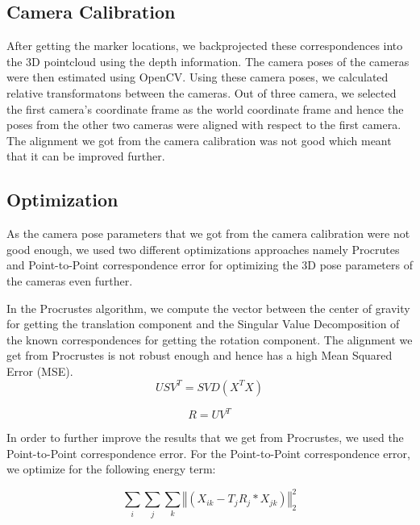 \documentclass[10pt,twocolumn,letterpaper]{article}
\begin{document}
\subsection{Camera Calibration}
After getting the marker locations, we backprojected these correspondences into the 3D pointcloud using the depth information. The camera poses of the cameras were then estimated using OpenCV. Using these camera poses, we calculated relative transformatons between the cameras. Out of three camera, we selected the first camera's coordinate frame as the world coordinate frame and hence the poses from the other two cameras were aligned with respect to the first camera. The alignment we got from the camera calibration was not good which meant that it can be improved further.

\subsection{Optimization}
As the camera pose parameters that we got from the camera calibration were not good enough, we used two different optimizations approaches namely Procrutes and Point-to-Point correspondence error for optimizing the 3D pose parameters of the cameras even further.
 
In the Procrustes algorithm, we compute the vector between the center of gravity for getting the translation component and the Singular Value Decomposition of the known correspondences for getting the rotation component. The alignment we get from Procrustes is not robust enough and hence has a high Mean Squared Error (MSE).\\

\begin{equation}\label{eq3}
USV^T=SVD(X^TX)
\end{equation}

\begin{equation}\label{eq4}
R=UV^T
\end{equation}

In order to further improve the results that we get from Procrustes, we used the Point-to-Point correspondence error. For the Point-to-Point correspondence error, we optimize for the following energy term:

\begin{equation}\label{eq5}
\sum_{i}\sum_{j}\sum_{k} \left\Vert\left(X_{ik} - T_jR_j*X_{jk}\right)\right\Vert_2^2
\end{equation}
\end{document}
